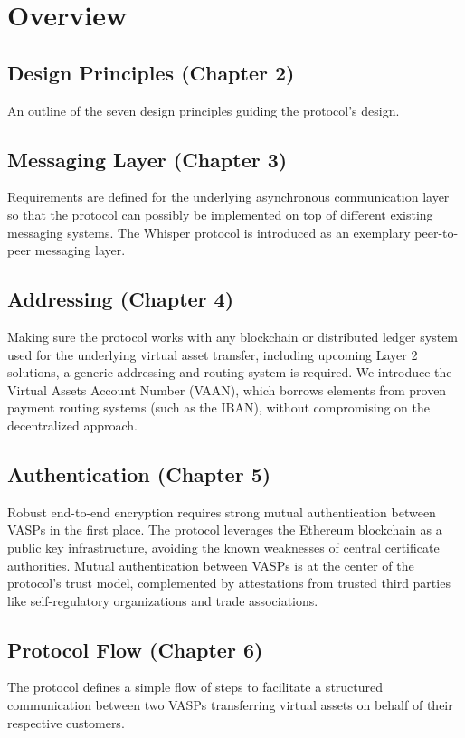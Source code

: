 \documentclass{article}
\begin{document}
\newpage
\tableofcontents
\newpage


\section{Overview}

\subsection*{Design Principles (Chapter 2)}
An outline of the seven design principles guiding the protocol's design.

\subsection*{Messaging Layer (Chapter 3)}
Requirements are defined for the underlying asynchronous communication layer so that the protocol can possibly be implemented on top of different existing messaging systems. The Whisper protocol is introduced as an exemplary peer-to-peer messaging layer.

\subsection*{Addressing (Chapter 4)}
Making sure the protocol works with any blockchain or distributed ledger system used for the underlying virtual asset transfer, including upcoming Layer 2 solutions, a generic addressing and routing system is required. We introduce the Virtual Assets Account Number (VAAN), which borrows elements from proven payment routing systems (such as the IBAN), without compromising on the decentralized approach.

\subsection*{Authentication (Chapter 5)}
Robust end-to-end encryption requires strong mutual authentication between VASPs in the first place. The protocol leverages the Ethereum blockchain as a public key infrastructure, avoiding the known weaknesses of central certificate authorities. Mutual authentication between VASPs is at the center of the protocol's trust model, complemented by attestations from trusted third parties like self-regulatory organizations and trade associations.

\subsection*{Protocol Flow (Chapter 6)}
The protocol defines a simple flow of steps to facilitate a structured communication between two VASPs transferring virtual assets on behalf of their respective customers.
\end{document}
